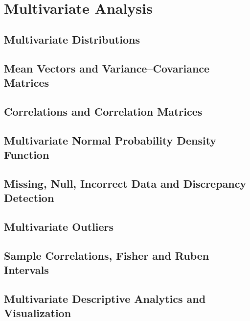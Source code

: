 \documentclass[12pt]{book}
\theoremstyle{definition}
\theoremstyle{remark}
\begin{document}
\chapter{Multivariate Analysis}

\section{Multivariate Distributions}

\section{Mean Vectors and Variance–Covariance Matrices}

\section{Correlations and Correlation Matrices}

\section{Multivariate Normal Probability Density Function}

\section{Missing, Null, Incorrect Data and Discrepancy Detection}

\section{Multivariate Outliers}

\section{Sample Correlations, Fisher and Ruben Intervals}

\section{Multivariate Descriptive Analytics and Visualization}
\end{document}
